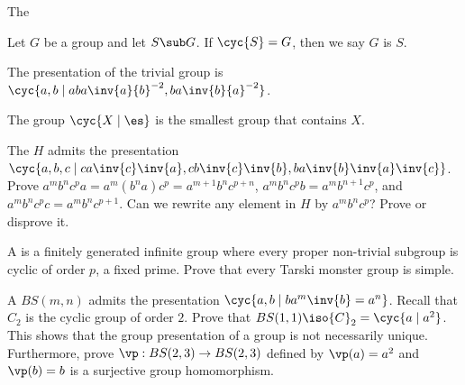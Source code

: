 \documentclass[10pt]{article}
\begin{document}
\begin{definition}
    The 
\end{definition}
\par
Let $G$ be a group and let $S\sub G$. If $\cyc{S}=G$, then we say $G$ is  $S$.
\begin{example}
    The presentation of the trivial group is $\cyc{a,b\mid aba\inv{a}{b}^{-2},ba\inv{b}{a}^{-2}}$.
\end{example}
\begin{proposition}
    The group $\cyc{X\mid\es}$ is the smallest group that contains $X$.
\end{proposition}
\begin{problem}
    The  $H$ admits the presentation $\cyc{a,b,c\mid ca\inv{c}\inv{a},cb\inv{c}\inv{b},ba\inv{b}\inv{a}\inv{c}}$. Prove ${a}^{m}{b}^{n}{c}^{p}a={a}^{m}({b}^{n}a){c}^{p}={a}^{m+1}{b}^{n}{c}^{p+n}$, ${a}^{m}{b}^{n}{c}^{p}b={a}^{m}{b}^{n+1}{c}^{p}$, and ${a}^{m}{b}^{n}{c}^{p}c={a}^{m}{b}^{n}{c}^{p+1}$. Can we rewrite any element in $H$ by ${a}^{m}{b}^{n}{c}^{p}$? Prove or disprove it.
\end{problem}
\begin{problem}
    A  is a finitely generated infinite group where every proper non-trivial subgroup is cyclic of order $p$, a fixed prime. Prove that every Tarski monster group is simple.
\end{problem}
\begin{problem}
    A  $BS(m,n)$ admits the presentation $\cyc{a,b\mid b{a}^{m}\inv{b}={a}^{n}}$. Recall that ${C}_{2}$ is the cyclic group of order $2$. Prove that $BS(1,1)\iso{C}_{2}=\cyc{a\mid{a}^{2}}$. This shows that the group presentation of a group is not necessarily unique. Furthermore, prove $\vp:BS(2,3)\to BS(2,3)$ defined by $\vp(a)={a}^{2}$ and $\vp(b)=b$ is a surjective group homomorphism.
\end{problem}
\newpage
\end{document}

